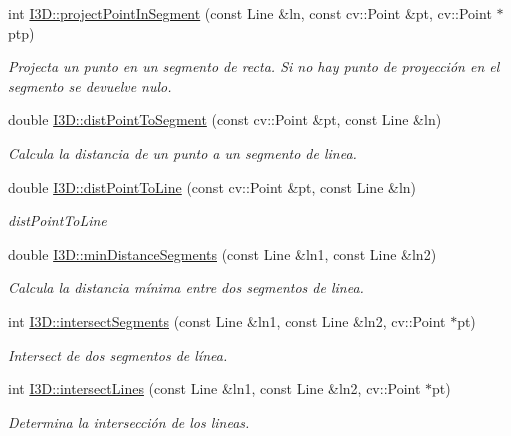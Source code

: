 \begin{DoxyCompactItemize}
int \hyperlink{group___geometric_entities_ga373cb249ff9ec768706e6299e466fcc3}{I3\+D\+::project\+Point\+In\+Segment} (const Line \&ln, const cv\+::\+Point \&pt, cv\+::\+Point $\ast$ptp)
\begin{DoxyCompactList}\small\item\em Projecta un punto en un segmento de recta. Si no hay punto de proyección en el segmento se devuelve nulo. \end{DoxyCompactList}\item 
double \hyperlink{group___geometric_entities_ga2c47087468458c7841306da1f626a42d}{I3\+D\+::dist\+Point\+To\+Segment} (const cv\+::\+Point \&pt, const Line \&ln)
\begin{DoxyCompactList}\small\item\em Calcula la distancia de un punto a un segmento de linea. \end{DoxyCompactList}\item 
double \hyperlink{group___geometric_entities_gaa655879a00ab3687d5a60674c3f2d730}{I3\+D\+::dist\+Point\+To\+Line} (const cv\+::\+Point \&pt, const Line \&ln)
\begin{DoxyCompactList}\small\item\em dist\+Point\+To\+Line \end{DoxyCompactList}\item 
double \hyperlink{group___geometric_entities_ga0f0852cb538b811ce51c1a3b448d9939}{I3\+D\+::min\+Distance\+Segments} (const Line \&ln1, const Line \&ln2)
\begin{DoxyCompactList}\small\item\em Calcula la distancia mínima entre dos segmentos de linea. \end{DoxyCompactList}\item 
int \hyperlink{group___geometric_entities_ga9ff1bbb70ad818d18cfb38a05af1a1d6}{I3\+D\+::intersect\+Segments} (const Line \&ln1, const Line \&ln2, cv\+::\+Point $\ast$pt)
\begin{DoxyCompactList}\small\item\em Intersect de dos segmentos de línea. \end{DoxyCompactList}\item 
int \hyperlink{group___geometric_entities_ga65f2cb15aae52d5a13f166481af56116}{I3\+D\+::intersect\+Lines} (const Line \&ln1, const Line \&ln2, cv\+::\+Point $\ast$pt)
\begin{DoxyCompactList}\small\item\em Determina la intersección de los lineas. \end{DoxyCompactList}\item 

\end{DoxyCompactItemize}
